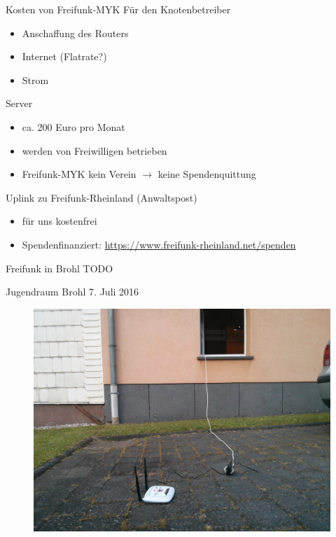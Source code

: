 \documentclass{beamer}
\begin{document}
\begin{frame}{Kosten von Freifunk-MYK}
Für den Knotenbetreiber
\begin{itemize}
\item Anschaffung des Routers
\item Internet (Flatrate?)
\item Strom
\end{itemize}
Server
\begin{itemize}
\item ca. 200 Euro pro Monat
\item werden von Freiwilligen betrieben
\item Freifunk-MYK kein Verein $\to$ keine Spendenquittung
\end{itemize}
Uplink zu Freifunk-Rheinland (Anwaltspost)
\begin{itemize}
\item für uns kostenfrei
\item Spendenfinanziert: \url{https://www.freifunk-rheinland.net/spenden}
\end{itemize}

\end{frame}

\begin{frame}{Freifunk in Brohl}
TODO

\end{frame}



\begin{frame}{Jugendraum Brohl 7. Juli 2016}
\begin{figure} 
\centering
\includegraphics[width=0.8\linewidth]{Bilder/Brohl2016-7-7}
\label{fig:brohl-7}
\end{figure}
\end{frame}
\end{document}
